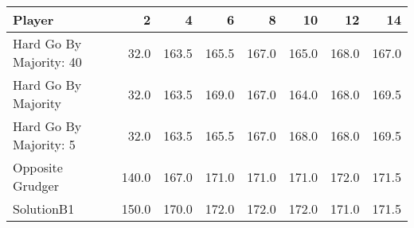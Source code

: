 \begin{tabular}{lrrrrrrr}
\toprule
                  Player &      2 &      4 &      6 &      8 &     10 &     12 &     14 \\
\midrule
 Hard Go By Majority: 40 &   32.0 &  163.5 &  165.5 &  167.0 &  165.0 &  168.0 &  167.0 \\
     Hard Go By Majority &   32.0 &  163.5 &  169.0 &  167.0 &  164.0 &  168.0 &  169.5 \\
  Hard Go By Majority: 5 &   32.0 &  163.5 &  165.5 &  167.0 &  168.0 &  168.0 &  169.5 \\
        Opposite Grudger &  140.0 &  167.0 &  171.0 &  171.0 &  171.0 &  172.0 &  171.5 \\
              SolutionB1 &  150.0 &  170.0 &  172.0 &  172.0 &  172.0 &  171.0 &  171.5 \\
\bottomrule
\end{tabular}
